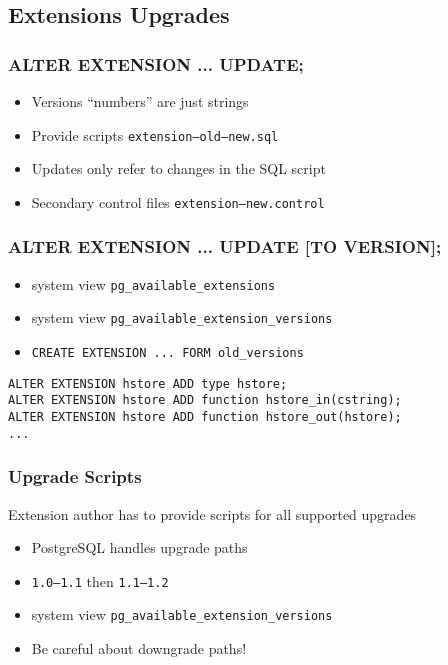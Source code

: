 \documentclass[english]{beamer}
\begin{document}
\subsection{Extensions Upgrades}



\begin{frame}[fragile]
  \frametitle{ALTER EXTENSION ... UPDATE;}

  \begin{itemize}
    \item<1-> Versions ``numbers'' are just strings
    \item<2-> Provide scripts \texttt{extension--old--new.sql}
    \item<3-> Updates only refer to changes in the SQL script
    \item<4-> Secondary control files \texttt{extension--new.control}
  \end{itemize}

\end{frame}

\begin{frame}[fragile]
  \frametitle{ALTER EXTENSION ... UPDATE [TO VERSION];}

  \begin{itemize}
    \item system view \texttt{pg\_available\_extensions}
    \item system view \texttt{pg\_available\_extension\_versions}
    \item \texttt{CREATE EXTENSION ... FORM old\_versions}
  \end{itemize}

  \begin{example}
\begin{verbatim}
ALTER EXTENSION hstore ADD type hstore;
ALTER EXTENSION hstore ADD function hstore_in(cstring);
ALTER EXTENSION hstore ADD function hstore_out(hstore);
...
\end{verbatim}
  \end{example}  
\end{frame}

\begin{frame}[fragile]
  \frametitle{Upgrade Scripts}

  Extension author has to provide scripts for all supported upgrades

  \begin{itemize}
    \item PostgreSQL handles upgrade paths
    \item \texttt{1.0--1.1} then \texttt{1.1--1.2}
    \item system view \texttt{pg\_available\_extension\_versions}
    \item Be careful about downgrade paths!
  \end{itemize}
  
\end{frame}
\end{document}
